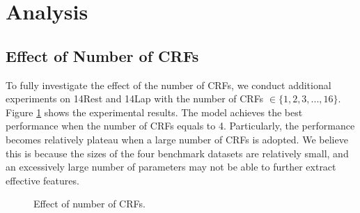 \documentclass[11pt,a4paper]{article}
\begin{document}
\section{Analysis}
\subsection{Effect of Number of CRFs}
To fully investigate the effect of the number of CRFs, we conduct additional experiments on 14Rest and 14Lap with the number of CRFs $\in \{1,2,3, ..., 16\}$. Figure \ref{fig:heads} shows the experimental results.
The model achieves the best performance when the number of CRFs equals to 4. Particularly, the performance becomes relatively plateau when a large number of CRFs is adopted. We believe this is because the sizes of the four benchmark datasets are relatively small, and an excessively large number of parameters may not be able to further extract effective features. 

\begin{figure}
\centering
{}
\caption{{Effect of number of CRFs.}}
\label{fig:heads}
\vspace{-1mm}
\end{figure}

 
\end{document}
